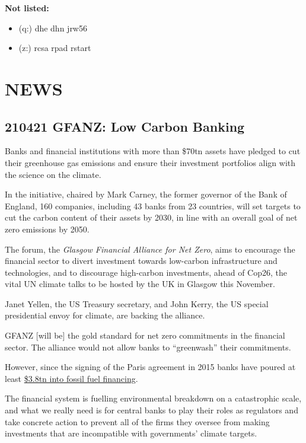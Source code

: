 \documentclass[
]{book}
\providecommand{\tightlist}{%
  \setlength{\itemsep}{0pt}\setlength{\parskip}{0pt}}
\begin{document}
\textbf{Not listed:}

\begin{itemize}
\tightlist
\item
  (q:) dhe dhn jrw56
\item
  (z:) rcsa rpad rstart
\end{itemize}

\hypertarget{news}{%
\chapter{NEWS}\label{news}}

\hypertarget{gfanz-low-carbon-banking}{%
\section{210421 GFANZ: Low Carbon Banking}\label{gfanz-low-carbon-banking}}

Banks and financial institutions with more than \$70tn assets have pledged to cut their greenhouse gas emissions and ensure their investment portfolios align with the science on the climate.

In the initiative, chaired by Mark Carney, the former governor of the Bank of England, 160 companies, including 43 banks from 23 countries, will set targets to cut the carbon content of their assets by 2030, in line with an overall goal of net zero emissions by 2050.

The forum, the \emph{Glasgow Financial Alliance for Net Zero}, aims to encourage the financial sector to divert investment towards low-carbon infrastructure and technologies, and to discourage high-carbon investments, ahead of Cop26, the vital UN climate talks to be hosted by the UK in Glasgow this November.

Janet Yellen, the US Treasury secretary, and John Kerry, the US special presidential envoy for climate, are backing the alliance.

GFANZ {[}will be{]} the gold standard for net zero commitments in the financial sector.
The alliance would not allow banks to ``greenwash'' their commitments.

However, since the signing of the Paris agreement in 2015 banks have poured at least
\href{https://www.theguardian.com/environment/2021/mar/24/big-banks-trillion-dollar-finance-for-fossil-fuels-shocking-says-report}{\$3.8tn into fossil fuel financing}.

The financial system is fuelling environmental breakdown on a catastrophic scale, and what we really need is for central banks to play their roles as regulators and take concrete action to prevent all of the firms they oversee from making investments that are incompatible with governments' climate targets.
\end{document}

